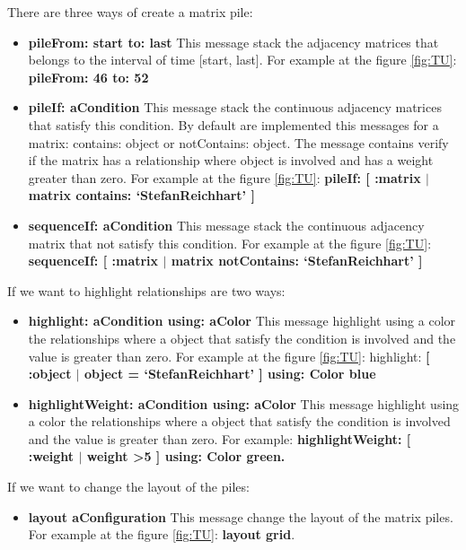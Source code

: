 There are three ways of create a matrix pile:
\begin{itemize}
\item\textbf{pileFrom: start to: last}
This message stack the adjacency matrices that belongs to the interval of time [start, last].
For example at the figure \ref{fig:TU}: \textbf{pileFrom: 46 to: 52} 
\item\textbf{pileIf: aCondition}
This message stack the continuous adjacency matrices that satisfy this condition. By default are implemented this messages for a matrix: contains: object or notContains: object. The message contains verify if the matrix has a relationship where object is involved and has a weight greater than zero.
For example at the figure \ref{fig:TU}: \textbf{pileIf: [ :matrix $|$ matrix contains: `StefanReichhart' ]}

\item\textbf{sequenceIf: aCondition}
This message stack the continuous adjacency matrix that not satisfy this condition. For example at the figure \ref{fig:TU}: \textbf{sequenceIf: [ :matrix $|$ matrix notContains: `StefanReichhart' ]}
\end{itemize}

If we want to highlight relationships are two ways:
\begin{itemize}
\item\textbf{highlight: aCondition using: aColor}
This message highlight using a color the relationships where a object that satisfy the condition is involved and the value is greater than zero.
For example at the figure \ref{fig:TU}: highlight: \textbf{[ :object $|$ object = `StefanReichhart' ] using:
Color blue}
\item\textbf{highlightWeight: aCondition using: aColor}
This message highlight using a color the relationships where a object that satisfy the condition is involved and the value is greater than zero.
For example: \textbf{highlightWeight: [ :weight $|$ weight \textgreater 5 ] using:
Color green.}
\end{itemize}

If we want to change the layout of the piles:
\begin{itemize}
\item\textbf{layout aConfiguration}
This message change the layout of the matrix piles.
For example at the figure \ref{fig:TU}: \textbf{layout grid}.
\end{itemize}

